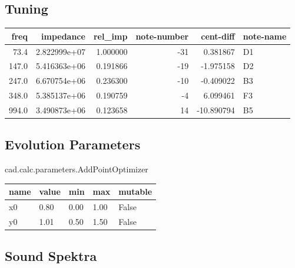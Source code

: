 \documentclass{article}
\begin{document}
\subsection{Tuning}
\begin{centering}
\begin{tabular}{rrrrrl}
\toprule
 freq &    impedance &  rel\_imp &  note-number &  cent-diff & note-name \\
\midrule
 73.4 & 2.822999e+07 & 1.000000 &          -31 &   0.381867 &        D1 \\
147.0 & 5.416363e+06 & 0.191866 &          -19 &  -1.975158 &        D2 \\
247.0 & 6.670754e+06 & 0.236300 &          -10 &  -0.409022 &        B3 \\
348.0 & 5.385137e+06 & 0.190759 &           -4 &   6.099461 &        F3 \\
994.0 & 3.490873e+06 & 0.123658 &           14 & -10.890794 &        B5 \\
\bottomrule
\end{tabular}
\end{centering}
\subsection{Evolution Parameters}

cad.calc.parameters.AddPointOptimizer

\begin{centering}
\begin{tabular}{lllll}
\toprule
name & value &  min &  max &  mutable \\
\midrule
  x0 &  0.80 & 0.00 & 1.00 &    False \\
  y0 &  1.01 & 0.50 & 1.50 &    False \\
\bottomrule
\end{tabular}
\end{centering}
\subsection{Sound Spektra}
\end{document}
